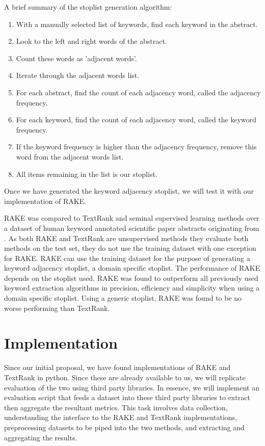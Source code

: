\documentclass[11pt,a4paper]{article}
\begin{document}
A brief summary of the stoplist generation algorithm:
\begin{enumerate}
	\item With a manually selected list of keywords, find each keyword in the abstract.
	\item Look to the left and right words of the abstract.
	\item Count these words as 'adjacent words'.
	\item Iterate through the adjacent words list.
	\item For each abstract, find the count of each adjacency word, called the adjacency frequency.
	\item For each keyword, find the count of each adjacency word, called the keyword frequency.
	\item If the keyword frequency is higher than the adjacency frequency, remove this word from the adjacent words list.
	\item All items remaining in the list is our stoplist. 
\end{enumerate}

Once we have generated the keyword adjacency stoplist, we will test it with our implementation of RAKE.

RAKE was compared to TextRank and seminal supervised learning methods \citep{hulth-2003-improved} over a dataset of human keyword annotated scientific paper abstracts originating from \citet{hulth-2003-improved}. As both RAKE and TextRank are unsupervised methods they evaluate both methods on the test set, they do not use the training dataset with one exception for RAKE. RAKE can use the training dataset for the purpose of generating a keyword adjacency stoplist, a domain specific stoplist. The performance of RAKE depends on the stoplist used. RAKE was found to outperform all previously used keyword extraction algorithms in precision, efficiency and simplicity when using a domain specific stoplist. Using a generic stoplist, RAKE was found to be no worse performing than TextRank.

\section{Implementation}
Since our initial proposal, we have found implementations of RAKE and TextRank in python. Since these are already available to us, we will replicate  evaluation of the two using third party libraries.  In essence, we will implement an evaluation script that feeds a dataset into these third party libraries to extract then aggregate the resultant metrics. This task involves data collection, understanding the interface to the RAKE and TextRank implementations, preprocessing datasets to be piped into the two methods, and extracting and aggregating the results.
\end{document}
